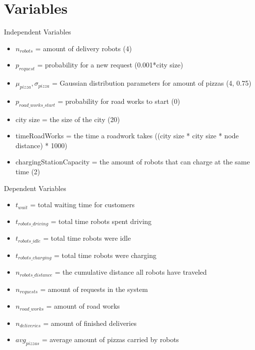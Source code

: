 \section{Variables}
\begin{frame}{Independent Variables}
    \begin{itemize}
        \item $n_{robots}$ = amount of delivery robots (4)
        \item $p_{request}$ = probability for a new request (0.001*city size)
        \item $\mu_{pizza}, \sigma_{pizza}$ = Gaussian distribution parameters for amount of pizzas (4, 0.75)
        \item $p_{road\_works\_start}$ = probability for road works to start (0)
        \item city size = the size of the city (20)
        \item timeRoadWorks = the time a roadwork takes ((city size * city size * node distance) * 1000)
        \item chargingStationCapacity = the amount of robots that can charge at the same time (2)
    \end{itemize}
\end{frame}

\begin{frame}{Dependent Variables}
    \begin{itemize}
        \item $t_{wait}$ = total waiting time for customers                             %
        \item $t_{robots\_driving}$ = total time robots spent driving                   %
        \item $t_{robots\_idle}$ = total time robots were idle                          %
        \item $t_{robots\_charging}$ = total time robots were charging                  %
        \item $n_{robots\_distance}$ = the cumulative distance all robots have traveled %
        \item $n_{requests}$ = amount of requests in the system                         %
        \item $n_{road\_works}$ = amount of road works                                  %
        \item $n_{deliveries}$ = amount of finished deliveries                          %
        \item $avg_{pizzas}$ = average amount of pizzas carried by robots               %
    \end{itemize}
\end{frame}

